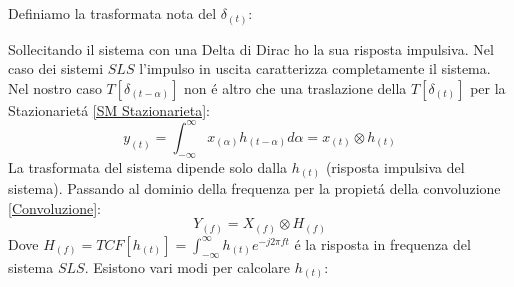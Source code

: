         Definiamo la trasformata nota del $\delta_{(t)}$:
        \begin{figure}[H]
            \centering 
        \label{Def impulso}
        \end{figure}
        Sollecitando il sistema con una Delta di Dirac ho la sua risposta impulsiva. Nel caso dei sistemi $SLS$ l'impulso
        in uscita caratterizza completamente il sistema. Nel nostro caso $T[\delta_{(t-\alpha)}]$ non é altro che una traslazione della $T[\delta_{(t)}]$ per la 
        Stazionarietá \ref*{SM Stazionarieta}: 
        \[
            y_{(t)} =\int_{-\infty}^{\infty}x_{(\alpha)}h_{(t-\alpha)}d\alpha = x_{(t)}\otimes h_{(t)} 
        \]
        La trasformata del sistema dipende solo dalla $h_{(t)}$ (risposta impulsiva del sistema). Passando al dominio della frequenza per la propietá della convoluzione \ref{Convoluzione}:
        \[
            Y_{(f)} =X_{(f)}\otimes H_{(f)} 
        \]
        Dove $H_{(f)} = TCF[h_{(t)}] = \int_{-\infty}^{\infty} h_{(t)}e^{-j2\pi ft}$ é la risposta in frequenza del sistema $SLS$. Esistono vari modi
        per calcolare $h_{(t)}$:
